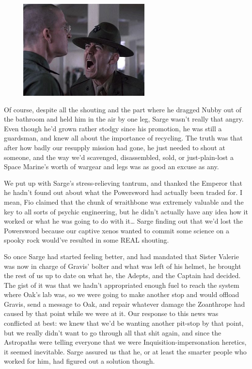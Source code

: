\begin{figure}
	\begin{center}
		\includegraphics[width=\figwidth]{pics/15/5.png}
	\end{center}
\end{figure}
Of course, despite all the shouting and the part where he dragged Nubby out of the bathroom and held him in the air by one leg, Sarge wasn't really that angry. 
Even though he'd grown rather stodgy since his promotion, he was still a guardsman, and knew all about the importance of recycling. 
The truth was that after how badly our resupply mission had gone, he just needed to shout at someone, and the way we'd scavenged, disassembled, sold, or just-plain-lost a Space Marine's worth of wargear and legs was as good an excuse as any. 


We put up with Sarge's stress-relieving tantrum, and thanked the Emperor that he hadn't found out about what the Powersword had actually been traded for. 
I mean, Fio claimed that the chunk of wraithbone was extremely valuable and the key to all sorts of psychic engineering, but he didn't actually have any idea how it worked or what he was going to do with it… Sarge finding out that we'd lost the Powersword because our captive xenos wanted to commit some science on a spooky rock would've resulted in some REAL shouting.

So once Sarge had started feeling better, and had mandated that Sister Valerie was now in charge of Gravis' bolter and what was left of his helmet, he brought the rest of us up to date on what he, the Adepts, and the Captain had decided. 
The gist of it was that we hadn't appropriated enough fuel to reach the system where Oak's lab was, so we were going to make another stop and would offload Gravis, send a message to Oak, and repair whatever damage the Zoanthrope had caused by that point while we were at it. 
Our response to this news was conflicted at best: 
we knew that we'd be wanting another pit-stop by that point, but we really didn't want to go through all that shit again, and since the Astropaths were telling everyone that we were Inquisition-impersonation heretics, it seemed inevitable. 
Sarge assured us that he, or at least the smarter people who worked for him, had figured out a solution though.

